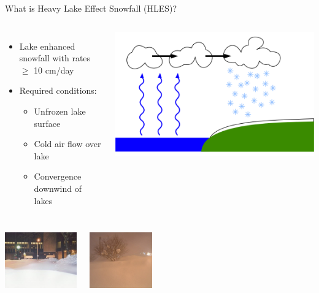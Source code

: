 \documentclass{beamer}
\begin{document}
  \begin{frame}{What is Heavy Lake Effect Snowfall (HLES)?}
    \centering

    \begin{columns}
        \begin{itemize}
            \item Lake enhanced snowfall with rates~$\geq$ 10 cm/day
            \item Required conditions:
              \begin{itemize}
                \footnotesize
                \item Unfrozen lake surface
                \item Cold air flow over lake
                \item Convergence downwind of lakes
              \end{itemize}
        \end{itemize}
        \centering
        \includegraphics[width=\textwidth]{hles_sketch}
    \end{columns}

    \vspace{2em}

    \begin{columns}
      \centering
        \centering
        \includegraphics[height=6.5em,frame=0.05em]{hles_photo1}

        \centering
        \includegraphics[height=6.5em,frame=0.05em]{hles_photo2}


\end{columns}
\end{frame}
\end{document}
